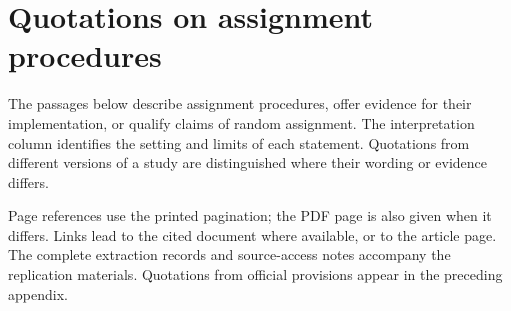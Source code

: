 \section{Quotations on assignment procedures}\label{app:claims}
The passages below describe assignment procedures, offer evidence for their implementation, or qualify claims of random assignment. The interpretation column identifies the setting and limits of each statement. Quotations from different versions of a study are distinguished where their wording or evidence differs.

Page references use the printed pagination; the PDF page is also given when it differs. Links lead to the cited document where available, or to the article page. The complete extraction records and source-access notes accompany the replication materials. Quotations from official provisions appear in the preceding appendix.

\begingroup\footnotesize

\endgroup
